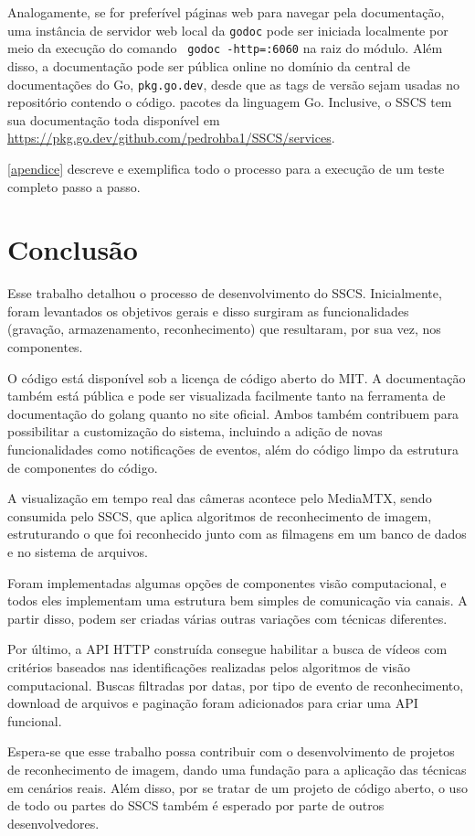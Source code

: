 \documentclass[12pt, %
openright, 
oneside, %
a4paper,    %
brazil]{facom-ufu-abntex2}
\begin{document}
Analogamente, se for preferível páginas web para navegar pela documentação, uma
instância de servidor web local da \texttt{godoc} pode ser iniciada localmente
por meio da execução do comando \texttt{ godoc -http=:6060} na raiz
do módulo. Além disso, a documentação pode ser pública online no domínio da
central de documentações do Go, \texttt{pkg.go.dev}, desde que as tags de
versão sejam usadas no repositório contendo o código. pacotes da linguagem Go.
Inclusive, o SSCS tem sua documentação toda disponível em
\url{https://pkg.go.dev/github.com/pedrohba1/SSCS/services}.

\autoref{apendice} descreve e exemplifica todo o processo para a execução de um
teste completo passo a passo.
\chapter[Conclusão]{Conclusão}
Esse trabalho detalhou o processo de desenvolvimento do SSCS. Inicialmente,
foram levantados os objetivos gerais e disso surgiram as funcionalidades
(gravação, armazenamento, reconhecimento) que resultaram, por sua vez, nos
componentes.

O código está disponível sob a licença de código aberto do MIT. A documentação
também está pública e pode ser visualizada facilmente tanto na ferramenta de
documentação do golang quanto no site oficial. Ambos também contribuem para
possibilitar a customização do sistema, incluindo a adição de novas
funcionalidades como notificações de eventos, além do código limpo da estrutura
de componentes do código.

A visualização em tempo real das câmeras acontece pelo MediaMTX, sendo
consumida pelo SSCS, que aplica algoritmos de reconhecimento de imagem,
estruturando o que foi reconhecido junto com as filmagens em um banco de dados
e no sistema de arquivos.

Foram implementadas algumas opções de componentes visão computacional, e todos
eles implementam uma estrutura bem simples de comunicação via canais. A partir
disso, podem ser criadas várias outras variações com técnicas diferentes.

Por último, a API HTTP construída consegue habilitar a busca de vídeos com
critérios baseados nas identificações realizadas pelos algoritmos de visão
computacional. Buscas filtradas por datas, por tipo de evento de
reconhecimento, download de arquivos e paginação foram adicionados para criar
uma API funcional.

Espera-se que esse trabalho possa contribuir com o desenvolvimento de projetos
de reconhecimento de imagem, dando uma fundação para a aplicação das técnicas
em cenários reais. Além disso, por se tratar de um projeto de código aberto, o
uso de todo ou partes do SSCS também é esperado por parte de outros
desenvolvedores.
\end{document}
